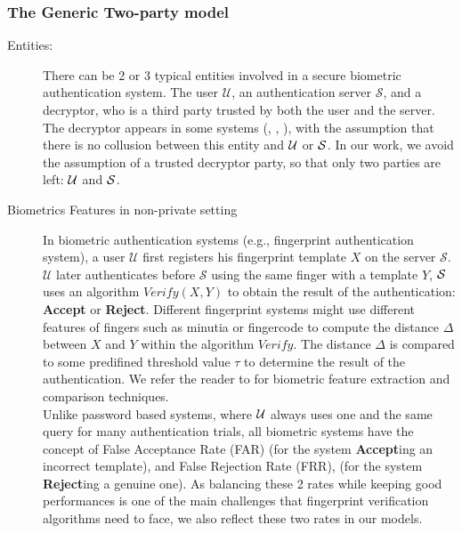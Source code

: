 \subsubsection{The Generic Two-party model}

\begin{description}
\item[Entities:] There can be 2 or 3 typical entities involved in a secure biometric authentication system. The user
  $\mathcal{U}$, an authentication server $\mathcal{S}$, and a decryptor, who is a third party trusted by both the
  user and the server. The decryptor appears in some systems (\cite{mandal2015comprehensive},
  \cite{hirano2013cryptographically}, \cite{higo2015privacy}), with the assumption that there is no collusion between
  this entity and $\mathcal{U}$ or $\mathcal{S}$. In our work, we avoid the assumption of a trusted decryptor party, so that
  only two parties are left: $\mathcal{U}$ and $\mathcal{S}$.
\item[Biometrics Features in non-private setting] In biometric authentication systems (e.g., fingerprint authentication
  system), a user $\mathcal{U}$ first
  registers his fingerprint template $X$ on the server $\mathcal{S}$. $\mathcal{U}$ later authenticates before
  $\mathcal{S}$ using the same finger with a template $Y$, $\mathcal{S}$ uses an algorithm $Verify(X,Y)$ to obtain the
  result of the authentication: \textbf{Accept} or \textbf{Reject}. Different fingerprint systems might use different
  features of fingers such as minutia or fingercode to compute the distance $\Delta$ between $X$ and $Y$ within the
  algorithm $Verify$. The distance $\Delta$ is compared to some predifined threshold value $\tau$ to determine the
  result of the authentication. We refer the reader to \cite{jain2007handbook} for biometric feature extraction and
  comparison techniques.\\

  Unlike password based systems, where $\mathcal{U}$ always uses one and the same query for many authentication trials, all biometric systems
  have the concept of False Acceptance Rate (FAR) (for the system \textbf{Accept}ing an incorrect template), and False
  Rejection Rate (FRR), (for the system \textbf{Reject}ing a genuine one).  As balancing these 2 rates while keeping good
  performances is one of the main challenges that fingerprint verification algorithms \cite{FVConGoi2:online} need to face,
we also reflect these two rates in our models.


\end{description}
